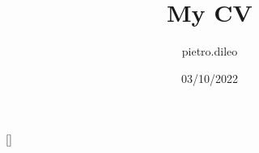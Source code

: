 \usepackage{titlesec} %

\titleformat{\section}{
	\bf \Large\raggedright}{}{0em}{}[\titlerule] %
\titlespacing{\section}{0pt}{12pt}{5pt} %

\usepackage{multicol}

\usepackage{qrcode}

\title{My CV}
\date{03/10/2022}
\author{pietro.dileo}
